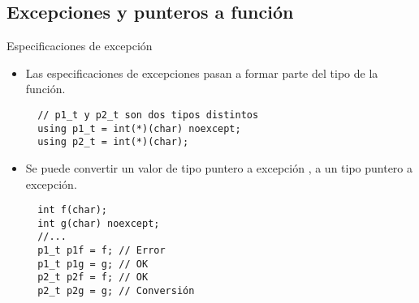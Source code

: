 \subsection{Excepciones y punteros a función}

\begin{frame}[t,fragile]{Especificaciones de excepción}
\begin{itemize}
  \item Las especificaciones de excepciones pasan a formar parte
        del tipo de la función.
\begin{lstlisting}
  // p1_t y p2_t son dos tipos distintos
  using p1_t = int(*)(char) noexcept;
  using p2_t = int(*)(char);
\end{lstlisting}
\vfill\pause
  \item Se puede convertir un valor de tipo puntero a excepción ,
        a un tipo puntero a excepción.
\begin{lstlisting}
  int f(char);
  int g(char) noexcept;
  //...
  p1_t p1f = f; // Error 
  p1_t p1g = g; // OK 
  p2_t p2f = f; // OK
  p2_t p2g = g; // Conversión
\end{lstlisting}
\end{itemize}
\end{frame}
